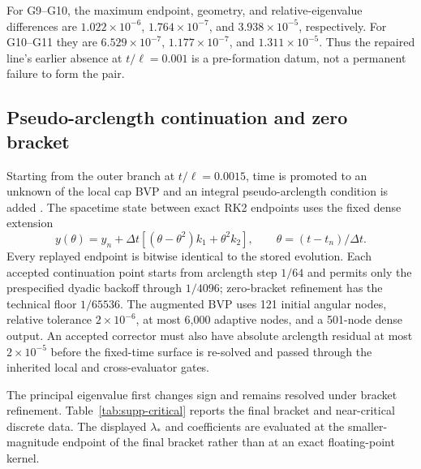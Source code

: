 \documentclass[11pt]{article}
\begin{document}
For G9--G10, the maximum endpoint, geometry, and relative-eigenvalue
differences are $1.022\times10^{-6}$, $1.764\times10^{-7}$, and
$3.938\times10^{-5}$, respectively.  For G10--G11 they are
$6.529\times10^{-7}$, $1.177\times10^{-7}$, and
$1.311\times10^{-5}$.  Thus the repaired line's earlier absence at
$t/\ell=0.001$ is a pre-formation datum, not a permanent failure to form the
pair.

\subsection{Pseudo-arclength continuation and zero bracket}

Starting from the outer branch at $t/\ell=0.0015$, time is promoted to an
unknown of the local cap BVP and an integral pseudo-arclength condition is
added \cite{Keller1977}.  The spacetime state between exact RK2 endpoints uses the fixed dense
extension
\begin{equation}
y(\theta)=y_n+\Delta t[(\theta-\theta^2)k_1+\theta^2k_2],
\qquad \theta=(t-t_n)/\Delta t .
\end{equation}
Every replayed endpoint is bitwise identical to the stored evolution.  Each
accepted continuation point starts from arclength step $1/64$ and permits only
the prespecified dyadic backoff through $1/4096$; zero-bracket refinement has
the technical floor $1/65536$.  The augmented BVP uses 121 initial angular
nodes, relative tolerance $2\times10^{-6}$, at most 6,000 adaptive nodes, and
a 501-node dense output.  An accepted corrector must also have absolute
arclength residual at most $2\times10^{-5}$ before the fixed-time surface is
re-solved and passed through the inherited local and cross-evaluator gates.

The principal eigenvalue first changes sign and remains resolved under
bracket refinement.  Table~\ref{tab:supp-critical} reports the final bracket
and near-critical discrete data.  The displayed $\lambda_*$ and coefficients
are evaluated at the smaller-magnitude endpoint of the final bracket rather
than at an exact floating-point kernel.
\end{document}
